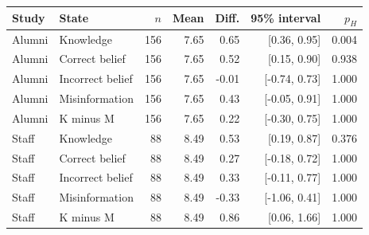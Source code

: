 \begin{tabular}{llrrrrr}
\toprule
Study & State & $n$ & Mean & Diff. & 95\% interval & $p_H$ \\
\midrule
Alumni & Knowledge & 156 & 7.65 & 0.65 & [0.36, 0.95] & 0.004 \\
Alumni & Correct belief & 156 & 7.65 & 0.52 & [0.15, 0.90] & 0.938 \\
Alumni & Incorrect belief & 156 & 7.65 & -0.01 & [-0.74, 0.73] & 1.000 \\
Alumni & Misinformation & 156 & 7.65 & 0.43 & [-0.05, 0.91] & 1.000 \\
Alumni & K minus M & 156 & 7.65 & 0.22 & [-0.30, 0.75] & 1.000 \\
Staff & Knowledge &  88 & 8.49 & 0.53 & [0.19, 0.87] & 0.376 \\
Staff & Correct belief &  88 & 8.49 & 0.27 & [-0.18, 0.72] & 1.000 \\
Staff & Incorrect belief &  88 & 8.49 & 0.33 & [-0.11, 0.77] & 1.000 \\
Staff & Misinformation &  88 & 8.49 & -0.33 & [-1.06, 0.41] & 1.000 \\
Staff & K minus M &  88 & 8.49 & 0.86 & [0.06, 1.66] & 1.000 \\
\bottomrule
\end{tabular}

